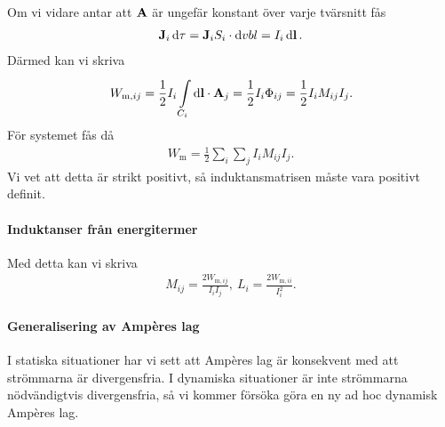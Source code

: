 Om vi vidare antar att $\vb{A}$ är ungefär konstant över varje tvärsnitt fås
\begin{align*}
	\vb{J}_{i}\dd{\tau} = \vb{J}_{i}S_{i}\cdot\dd{vb{l}} = I_{i}\dd{\vb{l}}.
\end{align*}
Därmed kan vi skriva
\begin{align*}
	W_{\text{m}, ij} = \frac{1}{2}I_{i}\int\limits_{C_{i}}^{}\dd{\vb{l}}\cdot \vb{A}_{j} = \frac{1}{2}I_{i}\Phi_{ij} = \frac{1}{2}I_{i}M_{ij}I_{j}.
\end{align*}
För systemet fås då
\begin{align*}
	W_{\text{m}} = \frac{1}{2}\sum\limits_{i}\sum\limits_{j}I_{i}M_{ij}I_{j}.
\end{align*}
Vi vet att detta är strikt positivt, så induktansmatrisen måste vara positivt definit.

\paragraph{Induktanser från energitermer}
Med detta kan vi skriva
\begin{align*}
	M_{ij} = \frac{2W_{\text{m}, ij}}{I_{i}I_{j}},\ L_{i} = \frac{2W_{\text{m}, ii}}{I_{i}^{2}}.
\end{align*}

\paragraph{Generalisering av Ampères lag}
I statiska situationer har vi sett att Ampères lag är konsekvent med att strömmarna är divergensfria. I dynamiska situationer är inte strömmarna nödvändigtvis divergensfria, så vi kommer försöka göra en ny ad hoc dynamisk Ampères lag.

